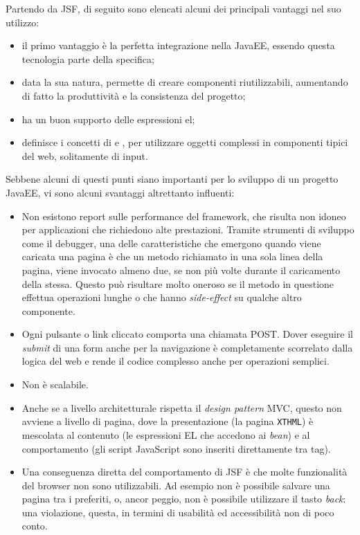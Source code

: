 Partendo da JSF, di seguito sono elencati alcuni dei principali vantaggi nel suo utilizzo:
\begin{itemize}
	\item il primo vantaggio è la perfetta integrazione nella JavaEE, essendo questa tecnologia parte della specifica;
	\item data la sua natura, permette di creare componenti riutilizzabili, aumentando di fatto la produttività e la consistenza del progetto;
	\item ha un buon supporto delle espressioni \gls{el};
	\item definisce i concetti di  e , per utilizzare oggetti complessi in componenti tipici del web, solitamente di input.
\end{itemize}
Sebbene alcuni di questi punti siano importanti per lo sviluppo di un progetto JavaEE, vi sono alcuni svantaggi altrettanto influenti:
\begin{itemize}
	\item Non esistono report sulle performance del framework, che risulta non idoneo per applicazioni che richiedono alte prestazioni. Tramite strumenti di sviluppo come il debugger, una delle caratteristiche che emergono quando viene caricata una pagina è che un metodo richiamato in una sola linea della pagina, viene invocato almeno due, se non più volte durante il caricamento della stessa. Questo può risultare molto oneroso se il metodo in questione effettua operazioni lunghe o che hanno \textit{side-effect} su qualche altro componente.
	\item Ogni pulsante o link cliccato comporta una chiamata POST. Dover eseguire il \textit{submit} di una form anche per la navigazione è completamente scorrelato dalla logica del web e rende il codice complesso anche per operazioni semplici.
	\item Non è scalabile.
	\item Anche se a livello architetturale rispetta il \textit{design pattern} MVC, questo non avviene a livello di pagina, dove la presentazione (la pagina \texttt{XTHML}) è mescolata al contenuto (le espressioni EL che accedono ai \textit{bean}) e al comportamento (gli script JavaScript sono inseriti direttamente tra tag).
	\item Una conseguenza diretta del comportamento di JSF è che molte funzionalità del browser non sono utilizzabili. Ad esempio non è possibile salvare una pagina tra i preferiti, o, ancor peggio, non è possibile utilizzare il tasto \textit{back}: una violazione, questa, in termini di usabilità ed accessibilità non di poco conto.
\end{itemize}
